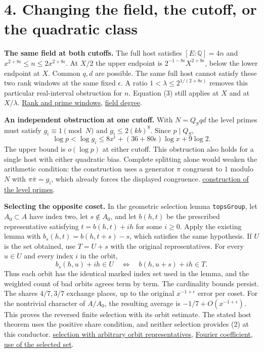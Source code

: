 \documentclass[11pt]{article}
\newcommand{\src}[2]{\href{https://github.com/Deicyde/riemann-hypothesis/blob/e7c8972c701d3396947808ab20cc16dc14623d33/src/#1.lean}{#2}}
\begin{document}
\newpage
\section*{4. Changing the field, the cutoff, or the quadratic class}
\textbf{The same field at both cutoffs.}
The full host satisfies $[E:\mathbb Q]=4n$ and $x^{2+8\epsilon}\le n\le 2x^{2+8\epsilon}$. At $X/2$ the upper endpoint is $2^{-1-8\epsilon}X^{2+8\epsilon}$, below the lower endpoint at $X$. Common $q,d$ are possible. The same full host cannot satisfy these two rank windows at the same fixed $\epsilon$. A ratio $1<\lambda\le 2^{1/(2+8\epsilon)}$ removes this particular real-interval obstruction for $n$. Equation (3) still applies at $X$ and at $X/\lambda$. \src{Development/AbelianVarietyTheory/Definitions/GlobalTwisting/PairRowIffQdRows}{Rank and prime windows}, \src{Formalism/SharpRestriction/GlobalSchurBounds/ConclusionR7abs}{field degree}.

\textbf{An independent obstruction at one cutoff.}
With $N=Q_Sqd$ the level primes must satisfy $g_i\equiv1\pmod N$ and $g_i\le2(kb)^8$. Since $p\mid Q_S$,
\[
 \log p<\log g_i\le8x^\epsilon+(36+80\epsilon)\log x+9\log 2.
\]
The upper bound is $o(\log p)$ at either cutoff. This obstruction also holds for a single host with either quadratic bias. Complete splitting alone would weaken the arithmetic condition: the construction uses a generator $\pi$ congruent to $1$ modulo $N$ with $\pi\bar\pi=g_i$, which already forces the displayed congruence. \src{Development/AutomorphicArithmetic/ShortNorms/hostOfFieldOf}{construction of the level primes}.

\textbf{Selecting the opposite coset.}
In the geometric selection lemma \texttt{topsGroup}, let $A_0\subset A$ have index two, let $s\notin A_0$, and let $b(h,t)$ be the prescribed representative satisfying $t=b(h,t)+ih$ for some $i\ge0$. Apply the existing lemma with $b_s(h,t)=b(h,t+s)-s$, which satisfies the same hypothesis. If $U$ is the set obtained, use $T=U+s$ with the original representatives. For every $u\in U$ and every index $i$ in the orbit,
\[
 b_s(h,u)+ih\in U\quad\Longleftrightarrow\quad b(h,u+s)+ih\in T .
\]
Thus each orbit has the identical marked index set used in the lemma, and the weighted count of bad orbits agrees term by term. The cardinality bounds persist. The shares $4/7,3/7$ exchange places, up to the original $x^{-1+\epsilon}$ error per coset. For the nontrivial character of $A/A_0$, the resulting average is $-1/7+O(x^{-1+\epsilon})$. This proves the reversed finite selection with its orbit estimate. The stated host theorem uses the positive share condition, and neither selection provides (2) at this conductor. \src{Development/AutomorphicArithmetic/ThickFrames/topsGroup}{selection with arbitrary orbit representatives}, \src{Development/AutomorphicArithmetic/PrimitiveCosets/TopsSum}{Fourier coefficient}, \src{Development/AutomorphicArithmetic/ShortNorms/hostOfFieldOf}{use of the selected set}.
\end{document}
